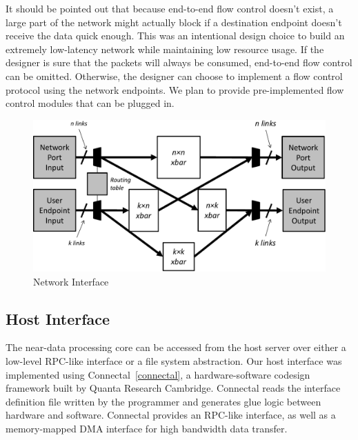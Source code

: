 It should be pointed out that because end-to-end flow control doesn't exist, a
large part of the network might actually block if a destination endpoint doesn't
receive the data quick enough. This was an intentional design choice to build an
extremely low-latency network while maintaining low resource usage. If the designer is sure that the packets will
always be consumed, end-to-end flow control can be omitted. Otherwise, the
designer can choose to implement a flow control protocol using the network
endpoints. We plan to provide pre-implemented flow control modules that can be
plugged in.

\begin{figure}[h]
	\begin{center}
	\includegraphics[scale=0.4]{figures/network-routing-crop.pdf}
	\caption{Network Interface}
	\label{fig:networkinterface}
	\end{center}
\end{figure}


\subsection{Host Interface}

The near-data processing core can be accessed from the host server over either a
low-level RPC-like interface or a file system abstraction. Our host interface
was implemented using Connectal~\ref{connectal}, a hardware-software codesign
framework built by Quanta Research Cambridge. Connectal reads the interface
definition file written by the programmer and generates glue logic between
hardware and software. Connectal provides an RPC-like interface, as well as a
memory-mapped DMA interface for high bandwidth data transfer.

